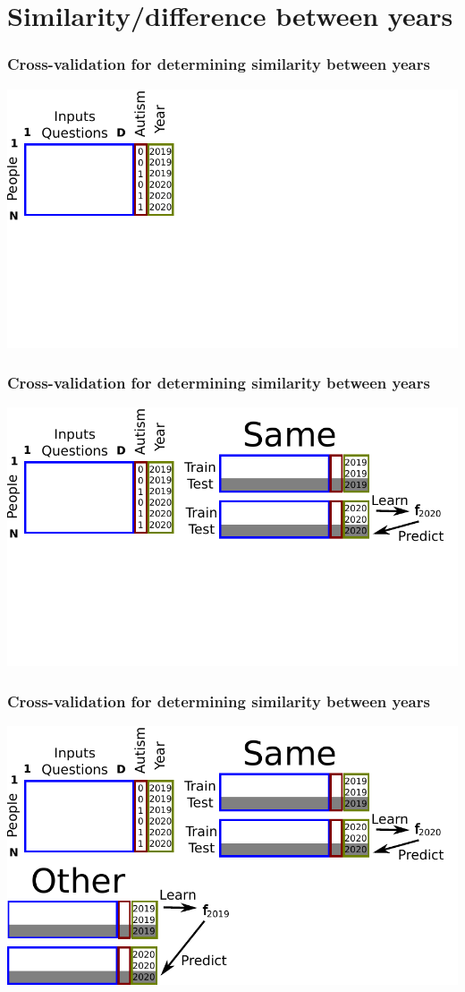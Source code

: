 \documentclass{beamer}
\begin{document}
\section{Similarity/difference between years}

\begin{frame}
  \frametitle{Cross-validation for determining similarity between years}
  \includegraphics[width=\textwidth]{drawing-cv-same-other-years-1.pdf}
\end{frame}

\begin{frame}
  \frametitle{Cross-validation for determining similarity between years}
  \includegraphics[width=\textwidth]{drawing-cv-same-other-years-2.pdf}
\end{frame}

\begin{frame}
  \frametitle{Cross-validation for determining similarity between years}
  \includegraphics[width=\textwidth]{drawing-cv-same-other-years-3.pdf}
\end{frame}
\end{document}
